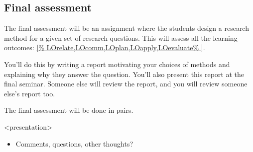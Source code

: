 \subsection{Final assessment}

The final assessment will be an assignment where the students design a research 
method for a given set of research questions.
This will assess all the learning outcomes: \cref{%
  LOrelate,LOcomm,LOplan,LOapply,LOevaluate%
}.

You'll do this by writing a report motivating your choices of methods and 
explaining why they answer the question.
You'll also present this report at the final seminar.
Someone else will review the report, and you will review someone else's report 
too.

The final assessment will be done in pairs.

%
%
%

\begin{frame}<presentation>
  \begin{question}
    \begin{itemize}
      \item Comments, questions, other thoughts?
    \end{itemize}
  \end{question}
\end{frame}



\begin{frame}[allowframebreaks]
\end{frame}

